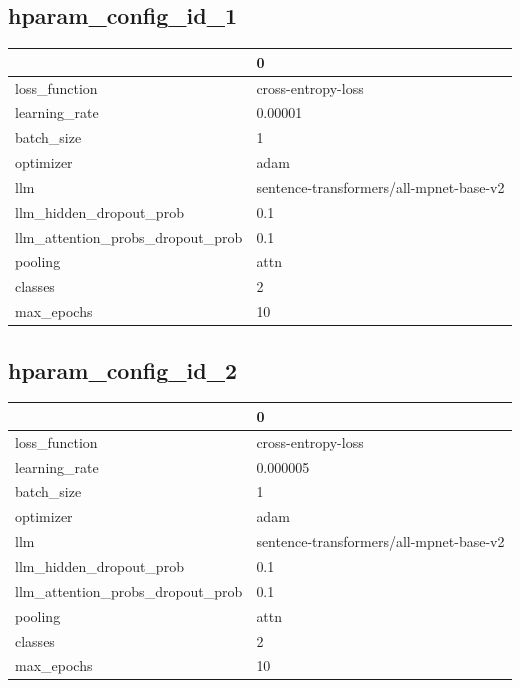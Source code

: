 \documentclass{article}
\begin{document}
\subsection{hparam\_config\_id\_1}
\begin{tabular}{ll}
\toprule
{} &                                        0 \\
\midrule
loss\_function                    &                       cross-entropy-loss \\
learning\_rate                    &                                  0.00001 \\
batch\_size                       &                                        1 \\
optimizer                        &                                     adam \\
llm                              &  sentence-transformers/all-mpnet-base-v2 \\
llm\_hidden\_dropout\_prob          &                                      0.1 \\
llm\_attention\_probs\_dropout\_prob &                                      0.1 \\
pooling                          &                                     attn \\
classes                          &                                        2 \\
max\_epochs                       &                                       10 \\
\bottomrule
\end{tabular}

\subsection{hparam\_config\_id\_2}
\begin{tabular}{ll}
\toprule
{} &                                        0 \\
\midrule
loss\_function                    &                       cross-entropy-loss \\
learning\_rate                    &                                 0.000005 \\
batch\_size                       &                                        1 \\
optimizer                        &                                     adam \\
llm                              &  sentence-transformers/all-mpnet-base-v2 \\
llm\_hidden\_dropout\_prob          &                                      0.1 \\
llm\_attention\_probs\_dropout\_prob &                                      0.1 \\
pooling                          &                                     attn \\
classes                          &                                        2 \\
max\_epochs                       &                                       10 \\
\bottomrule
\end{tabular}
\end{document}
